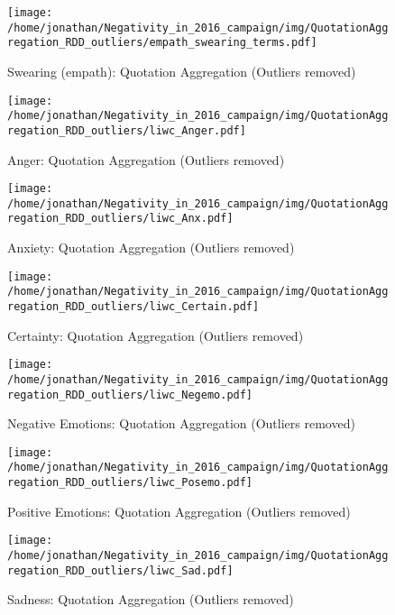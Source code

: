 \begin{figure}[h]\centering
	\texttt{[image: /home/jonathan/Negativity\_in\_2016\_campaign/img/QuotationAggregation\_RDD\_outliers/empath\_swearing\_terms.pdf]}
	\caption{Swearing (empath): Quotation Aggregation (Outliers removed)}
	\label{fig: qa_Swearing (empath)}
\end{figure}

\begin{figure}[h]\centering
	\texttt{[image: /home/jonathan/Negativity\_in\_2016\_campaign/img/QuotationAggregation\_RDD\_outliers/liwc\_Anger.pdf]}
	\caption{Anger: Quotation Aggregation (Outliers removed)}
	\label{fig: qa_Anger}
\end{figure}

\begin{figure}[h]\centering
	\texttt{[image: /home/jonathan/Negativity\_in\_2016\_campaign/img/QuotationAggregation\_RDD\_outliers/liwc\_Anx.pdf]}
	\caption{Anxiety: Quotation Aggregation (Outliers removed)}
	\label{fig: qa_Anxiety}
\end{figure}

\begin{figure}[h]\centering
	\texttt{[image: /home/jonathan/Negativity\_in\_2016\_campaign/img/QuotationAggregation\_RDD\_outliers/liwc\_Certain.pdf]}
	\caption{Certainty: Quotation Aggregation (Outliers removed)}
	\label{fig: qa_Certainty}
\end{figure}

\begin{figure}[h]\centering
	\texttt{[image: /home/jonathan/Negativity\_in\_2016\_campaign/img/QuotationAggregation\_RDD\_outliers/liwc\_Negemo.pdf]}
	\caption{Negative Emotions: Quotation Aggregation (Outliers removed)}
	\label{fig: qa_Negative Emotions}
\end{figure}

\begin{figure}[h]\centering
	\texttt{[image: /home/jonathan/Negativity\_in\_2016\_campaign/img/QuotationAggregation\_RDD\_outliers/liwc\_Posemo.pdf]}
	\caption{Positive Emotions: Quotation Aggregation (Outliers removed)}
	\label{fig: qa_Positive Emotions}
\end{figure}

\begin{figure}[h]\centering
	\texttt{[image: /home/jonathan/Negativity\_in\_2016\_campaign/img/QuotationAggregation\_RDD\_outliers/liwc\_Sad.pdf]}
	\caption{Sadness: Quotation Aggregation (Outliers removed)}
	\label{fig: qa_Sadness}
\end{figure}

